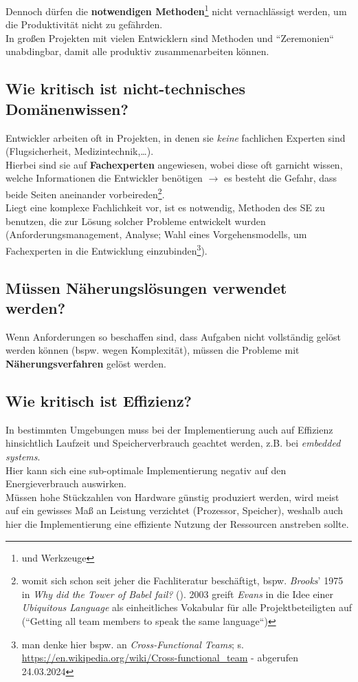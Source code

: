 \noindent
Dennoch dürfen die \textbf{notwendigen Methoden}\footnote{und Werkzeuge} nicht vernachlässigt werden, um die Produktivität nicht zu gefährden.\\

\noindent
In großen Projekten mit vielen Entwicklern sind Methoden und ``Zeremonien`` unabdingbar, damit alle produktiv zusammenarbeiten können.

\subsection{Wie kritisch ist nicht-technisches Domänenwissen?}
Entwickler arbeiten oft in Projekten, in denen sie \textit{keine} fachlichen Experten sind (Flugsicherheit, Medizintechnik,\ldots).\\
Hierbei sind sie auf \textbf{Fachexperten} angewiesen, wobei diese oft garnicht wissen, welche Informationen die Entwickler benötigen $\rightarrow$ es besteht die Gefahr, dass beide Seiten aneinander vorbeireden\footnote{
womit sich schon seit jeher die Fachliteratur beschäftigt, bspw. \textit{Brooks}' 1975 in \textit{Why did the Tower of Babel fail?} (\cite{Bro95}). 2003 greift \textit{Evans} in \cite{Eva03} die Idee einer \textit{Ubiquitous Language} als einheitliches Vokabular für alle Projektbeteiligten auf (``Getting all team members to speak the same language``)
}.\\
Liegt eine komplexe Fachlichkeit vor, ist es notwendig, Methoden des SE zu benutzen, die zur Lösung solcher Probleme entwickelt wurden (Anforderungsmanagement, Analyse; Wahl eines Vorgehensmodells, um Fachexperten in die Entwicklung einzubinden\footnote{
man denke hier bspw. an \textit{Cross-Functional Teams}; s. \url{https://en.wikipedia.org/wiki/Cross-functional_team} - abgerufen 24.03.2024
}).\\

\subsection{Müssen Näherungslösungen verwendet werden?}
Wenn Anforderungen so beschaffen sind, dass Aufgaben nicht vollständig gelöst werden können (bspw. wegen Komplexität), müssen die Probleme mit \textbf{Näherungsverfahren} gelöst werden.\\

\subsection{Wie kritisch ist Effizienz?}
In bestimmten Umgebungen muss bei der Implementierung auch auf Effizienz hinsichtlich Laufzeit und Speicherverbrauch geachtet werden, z.B. bei \textit{embedded systems}.\\
Hier kann sich eine sub-optimale Implementierung negativ auf den Energieverbrauch auswirken.\\
Müssen hohe Stückzahlen von Hardware günstig produziert werden, wird meist auf ein gewisses Maß an Leistung verzichtet (Prozessor, Speicher), weshalb auch hier die Implementierung eine effiziente Nutzung der Ressourcen anstreben sollte.\\

